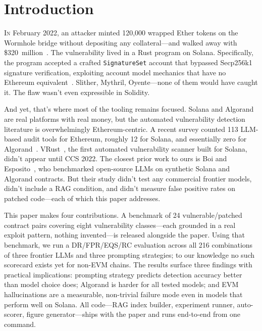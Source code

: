 \documentclass[journal]{IEEEtran}
\begin{document}
\section{Introduction}
\label{sec:intro}

\lettrine[nindent=0em,slope=-.5em]{I}{n} February 2022, an attacker minted
120{,}000 wrapped Ether tokens on the Wormhole bridge without depositing
any collateral---and walked away with \$320~million~\cite{halborn2022wormhole,certik2022wormhole}.
The vulnerability lived in a Rust program on Solana.
Specifically, the program accepted a crafted \texttt{SignatureSet} account
that bypassed Secp256k1 signature verification, exploiting account model
mechanics that have no Ethereum equivalent~\cite{kudelski2022wormhole,immunebytes2022wormhole}.
Slither, Mythril, Oyente---none of them would have caught it.
The flaw wasn't even expressible in Solidity.

And yet, that's where most of the tooling remains focused.
Solana and Algorand are real platforms with real money, but the
automated vulnerability detection literature is overwhelmingly
Ethereum-centric.
A recent survey counted 113 LLM-based audit tools for Ethereum, roughly 12 for
Solana, and essentially zero for Algorand~\cite{li2025solana}.
VRust~\cite{cui2022vrust}, the first automated vulnerability scanner built
for Solana, didn't appear until CCS 2022.
The closest prior work to ours is Boi and Esposito~\cite{boi2025prompt},
who benchmarked open-source LLMs on synthetic Solana and Algorand contracts.
But their study didn't test any commercial frontier models, didn't include
a RAG condition, and didn't measure false positive rates on patched
code---each of which this paper addresses.

This paper makes four contributions.
A benchmark of 24 vulnerable/patched contract pairs covering eight vulnerability
classes---each grounded in a real exploit pattern, nothing invented---is
released alongside the paper.
Using that benchmark, we run a DR/FPR/EQS/RC evaluation across all 216
combinations of three frontier LLMs and three prompting strategies; to our
knowledge no such scorecard exists yet for non-EVM chains.
The results surface three findings with practical implications: prompting
strategy predicts detection accuracy better than model choice does; Algorand
is harder for all tested models; and EVM hallucinations are a measurable,
non-trivial failure mode even in models that perform well on Solana.
All code---RAG index builder, experiment runner, auto-scorer, figure
generator---ships with the paper and runs end-to-end from one command.
\end{document}
